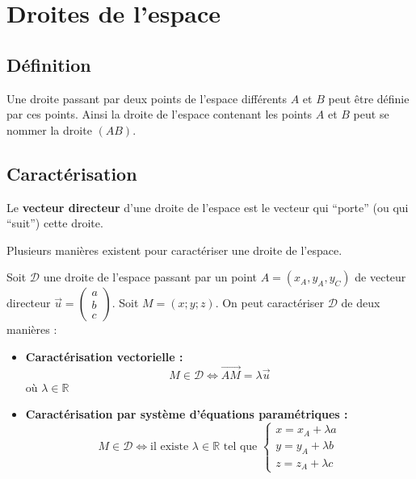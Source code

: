 	\section{Droites de l'espace}

	\subsection{Définition}

	Une droite passant par deux points de l'espace différents $A$ et $B$ peut être définie par ces points. Ainsi la droite de l'espace contenant les points $A$ et $B$ peut se nommer la droite $(AB)$.

	\subsection{Caractérisation}

	\begin{formula}
		Le \textbf{vecteur directeur} d'une droite de l'espace est le vecteur qui ``porte'' (ou qui ``suit'') cette droite.
	\end{formula}

	Plusieurs manières existent pour caractériser une droite de l'espace.

	\begin{formula}
		Soit $\mathcal{D}$ une droite de l'espace passant par un point $A = (x_A, y_A, y_C)$ de vecteur directeur $\overrightarrow{u} = \begin{pmatrix} a \\ b \\ c \end{pmatrix}$.
		\newpar
		Soit $M = (x; y; z)$. On peut caractériser $\mathcal{D}$ de deux manières :
		\begin{itemize}
			\item \textbf{Caractérisation vectorielle :}
			\[ M \in \mathcal{D} \iff \overrightarrow{AM} = \lambda \overrightarrow{u} \]
			où $\lambda \in \mathbb{R}$
			\item \textbf{Caractérisation par système d'équations paramétriques :}
			\[ M \in \mathcal{D} \iff \text{il existe } \lambda \in \mathbb{R} \text{ tel que } \begin{cases} x = x_A + \lambda a \\ y = y_A + \lambda b \\ z = z_A + \lambda c \end{cases} \]
		\end{itemize}
	\end{formula}

